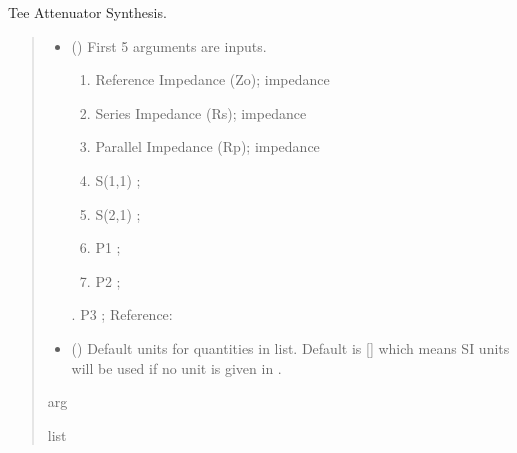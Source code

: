 \documentclass[letterpaper,10pt,english]{sphinxmanual}
\begin{document}

\begin{fulllineitems}
\label{\detokenize{components:components.Tee_Attenuator_Synthesis}}
\pysigstartsignatures
{}
\pysigstopsignatures
\sphinxAtStartPar
Tee Attenuator Synthesis.
\begin{quote}\begin{description}
\begin{itemize}
\item {} 
\sphinxAtStartPar
{} () \textendash{} 
\sphinxAtStartPar
First 5 arguments are inputs.
\begin{enumerate}
%
\item {} 
\sphinxAtStartPar
Reference Impedance (Zo); impedance

\item {} 
\sphinxAtStartPar
Series Impedance (Rs); impedance

\item {} 
\sphinxAtStartPar
Parallel Impedance (Rp); impedance

\item {} 
\sphinxAtStartPar
S(1,1) ;

\item {} 
\sphinxAtStartPar
S(2,1) ;

\item {} 
\sphinxAtStartPar
P1 ;

\item {} 
\sphinxAtStartPar
P2 ;

\end{enumerate}

. P3 ;
Reference:


\item {} 
\sphinxAtStartPar
{} (\sphinxstyleliteralemphasis{\sphinxupquote{, }}) \textendash{} Default units for quantities in  list. Default is {[}{]} which means SI units will be used if no unit is given in .

\end{itemize}

\sphinxAtStartPar
arg

\sphinxAtStartPar
list

\end{description}\end{quote}

\end{fulllineitems}
\end{document}
